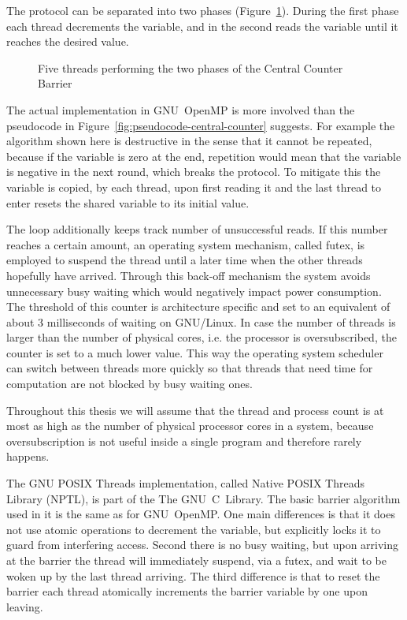 \documentclass[a4paper, 10pt]{article}
\begin{document}
The protocol can be separated into two phases (Figure~\ref{fig:diagram-central-counter}). During the first phase each thread decrements the variable, and in the second reads the variable until it reaches the desired value.

\begin{figure}[H]
	\centering
	
	\caption{Five threads performing the two phases of the Central Counter Barrier}
	\label{fig:diagram-central-counter}
\end{figure}

The actual implementation in GNU~OpenMP is more involved than the pseudocode in Figure~\ref{fig:pseudocode-central-counter} suggests. For example the algorithm shown here is destructive in the sense that it cannot be repeated, because if the variable is zero at the end, repetition would mean that the variable is negative in the next round, which breaks the protocol. To mitigate this the variable is copied, by each thread, upon first reading it and the last thread to enter resets the shared variable to its initial value.

The loop additionally keeps track number of unsuccessful reads. If this number reaches a certain amount, an operating system mechanism, called futex\cite{franke2002}, is employed to suspend the thread until a later time when the other threads hopefully have arrived. Through this back-off mechanism the system avoids unnecessary busy waiting which would negatively impact power consumption. The threshold of this counter is architecture specific and set to an equivalent of about 3 milliseconds of waiting on GNU/Linux. In case the number of threads is larger than the number of physical cores, i.e. the processor is oversubscribed, the counter is set to a much lower value. This way the operating system scheduler can switch between threads more quickly so that threads that need time for computation are not blocked by busy waiting ones.

Throughout this thesis we will assume that the thread and process count is at most as high as the number of physical processor cores in a system, because oversubscription is not useful inside a single program and therefore rarely happens.

The GNU POSIX Threads implementation, called Native POSIX Threads Library (NPTL), is part of the The GNU~C~Library.
The basic barrier algorithm used in it is the same as for GNU~OpenMP. One main differences is that it does not use atomic operations to decrement the variable, but explicitly locks it to guard from interfering access. Second there is no busy waiting, but upon arriving at the barrier the thread will immediately suspend, via a futex, and wait to be woken up by the last thread arriving. The third difference is that to reset the barrier each thread atomically increments the barrier variable by one upon leaving.
\end{document}
